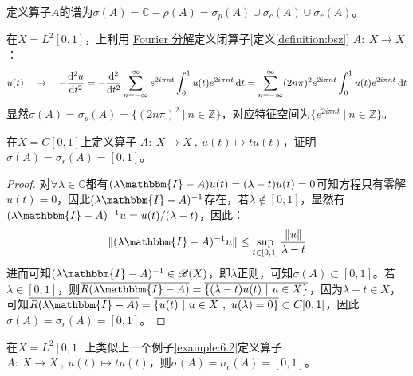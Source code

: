 \begin{definition}[算子的谱]
定义算子$A$的谱为$\sigma(A)=\mathbb{C}-\rho(A)=\sigma_p(A)\cup\sigma_c(A)\cup\sigma_r(A)$。
\end{definition}

\begin{example}
\quad 在$X=L^2[0,1]$，上利用 \href{https://math.fandom.com/zh/wiki/Fourier_%E7%BA%A7%E6%95%B0}{Fourier 分解}定义闭算子[定义\ref{definition:bsz}] $A: \ X \to X$：
\[u(t) \quad \mapsto \quad -\dv[2]{u}{t}=-\dv[2]{t}\sum_{n=-\infty}^{\infty}e^{2i\pi nt}\int_0^1u(t)e^{2i\pi nt}\dd{t}=\sum_{n=-\infty}^{\infty}(2n\pi)^2e^{2i\pi nt}\int_0^1u(t)e^{2i\pi nt}\dd{t}\]
显然$\sigma(A)=\sigma_p(A)=\{(2n\pi)^2 \ | \ n \in \mathbb{Z}\}$，对应特征空间为$\{e^{2i\pi nt} \ | \ n\in\mathbb{Z}\}$。
\end{example}

\begin{example}\label{example:6.2}
\quad 在$X=C[0,1]$上定义算子 $A: \ X \to X \ , \ u(t) \mapsto tu(t)$，证明$\sigma(A)=\sigma_r(A)=[0,1]$。
\end{example}
\begin{proof}
对$\forall \lambda \in \mathbb{C}$都有$(\lambda\mathbbm{I}-A)u(t)=(\lambda-t)u(t)=0$可知方程只有零解$u(t)=0$，因此$(\lambda\mathbbm{I}-A)^{-1}$存在，若$\lambda \notin [0,1]$，显然有$(\lambda\mathbbm{I}-A)^{-1}u=u(t)/(\lambda-t)$，因此：
\[\|(\lambda\mathbbm{I}-A)^{-1}u\| \leq \sup_{t \in [0,1]}\frac{\|u\|}{\lambda-t}\]
进而可知$(\lambda\mathbbm{I}-A)^{-1} \in \mathscr{B}(X)$，即$\lambda$正则，可知$\sigma(A) \subset [0,1]$。若$\lambda \in [0,1]$，则$\overline{R(\lambda\mathbbm{I}-A)}=\overline{\{(\lambda-t)u(t) \ | \ u \in X\}}$，因为$\lambda-t \in X$，可知$\overline{R(\lambda\mathbbm{I}-A)}=\overline{\{u(t) \ | \ u \in X \ , \ u(\lambda)=0\}} \subset C[0,1]$，因此$\sigma(A)=\sigma_r(A)=[0,1]$。
\end{proof}

\begin{example}
\quad 在$X=L^2[0,1]$上类似上一个例子\ref{example:6.2}定义算子 $A: \ X \to X \ , \ u(t) \mapsto tu(t)$，则$\sigma(A)=\sigma_c(A)=[0,1]$。
\end{example}

